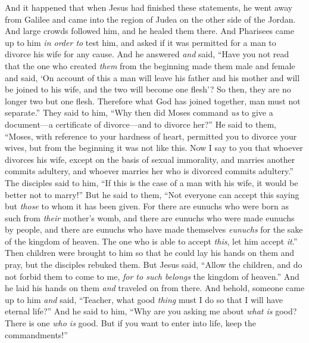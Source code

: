 \begin{biblechapter} %
 And it happened that when Jesus had finished these statements, he went away from Galilee and came into the region of Judea on the other side of the Jordan.
\verse And large crowds followed him, and he healed them there.
\verse And Pharisees came up to him \textit{in order to} test him, and asked if it was permitted for a man to divorce his wife for any cause.
\verse And he answered \textit{and} said, “Have you not read that the one who created \textit{them} from the beginning made them male and female
\verse and said, ‘On account of this a man will leave his father and his mother and will be joined to his wife, and the two will become one flesh’?
\verse So then, they are no longer two but one flesh. Therefore what God has joined together, man must not separate.”
\verse They said to him, “Why then did Moses command \textit{us} to give a document—a certificate of divorce—and to divorce her?”
\verse He said to them, “Moses, with reference to your hardness of heart, permitted you to divorce your wives, but from the beginning it was not like this.
\verse Now I say to you that whoever divorces his wife, except on the basis of sexual immorality, and marries another commits adultery, and whoever marries her who is divorced commits adultery.”
\verse The disciples said to him, “If this is the case of a man with his wife, it would be better not to marry!”
\verse But he said to them, “Not everyone can accept this saying but \textit{those} to whom it has been given.
\verse For there are eunuchs who were born as such from \textit{their} mother’s womb, and there are eunuchs who were made eunuchs by people, and there are eunuchs who have made themselves \textit{eunuchs} for the sake of the kingdom of heaven. The one who is able to accept \textit{this}, let him accept \textit{it}.”
 Then children were brought to him so that he could lay his hands on them and pray, but the disciples rebuked them.
\verse But Jesus said, “Allow the children, and do not forbid them to come to me, \textit{for to such belongs} the kingdom of heaven.”
\verse And he laid his hands on them \textit{and} traveled on from there.
 And behold, someone came up to him \textit{and} said, “Teacher, what good \textit{thing} must I do so that I will have eternal life?”
\verse And he said to him, “Why are you asking me about \textit{what is} good? There is one \textit{who is} good. But if you want to enter into life, keep the commandments!”

\end{biblechapter}
